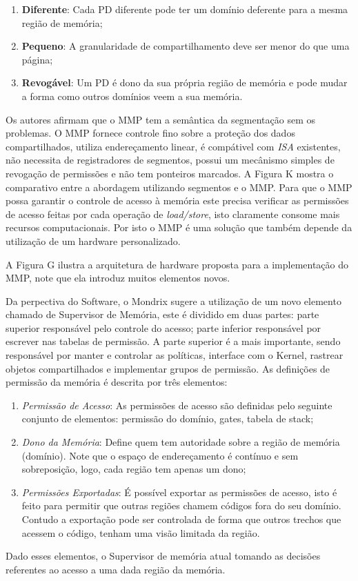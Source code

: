 \begin{enumerate}
	\item \textbf{Diferente}: Cada PD diferente pode ter um domínio deferente
				para a mesma região de memória;
	\item \textbf{Pequeno}: A granularidade de compartilhamento deve ser menor
				do que uma página;
	\item \textbf{Revogável}: Um PD é dono da sua própria região de memória e
				pode mudar a forma como outros domínios veem a sua memória.
\end{enumerate}


Os autores afirmam que o MMP tem a semântica da segmentação sem os problemas. O
MMP fornece controle fino sobre a proteção dos dados compartilhados, utiliza
endereçamento linear, é compátivel com \emph{ISA} existentes, não necessita de
registradores de segmentos, possui um mecânismo simples de revogação de
permissões e não tem ponteiros marcados. A Figura K mostra o comparativo entre
a abordagem utilizando segmentos e o MMP. Para que o MMP possa garantir o
controle de acesso à memória este precisa verificar as permissões de acesso
feitas por cada operação de \emph{load/store}, isto claramente consome mais
recursos computacionais. Por isto o MMP é uma solução que também depende da
utilização de um hardware personalizado.


A Figura G ilustra a arquitetura de hardware proposta para a implementação do
MMP, note que ela introduz muitos elementos novos. %

Da perpectiva do Software, o Mondrix \citep{mondrix} sugere a utilização de um
novo elemento chamado de Supervisor de Memória, este é dividido em duas partes:
parte superior responsável pelo controle do acesso; parte inferior responsável
por escrever nas tabelas de permissão. A parte superior é a mais importante,
sendo responsável por manter e controlar as políticas, interface com o Kernel,
rastrear objetos compartilhados e implementar grupos de permissão. As
definições de permissão da memória é descrita por três elementos:
\begin{enumerate}
	\item \emph{Permissão de Acesso}: As permissões de acesso são definidas pelo
				seguinte conjunto de elementos: permissão do domínio, gates, tabela de
				stack;
	\item \emph{Dono da Memória}: Define quem tem autoridade sobre a região de
				memória (domínio). Note que o espaço de endereçamento é contínuo e sem
				sobreposição, logo, cada região tem apenas um dono;
	\item \emph{Permissões Exportadas}: É possível exportar as permissões de
				acesso, isto é feito para permitir que outras regiões chamem códigos
				fora do seu domínio. Contudo a exportação pode ser controlada de forma
				que outros trechos que acessem o código, tenham uma visão limitada da
				região.
\end{enumerate}
Dado esses elementos, o Supervisor de memória atual tomando as decisões
referentes ao acesso a uma dada região da memória.


